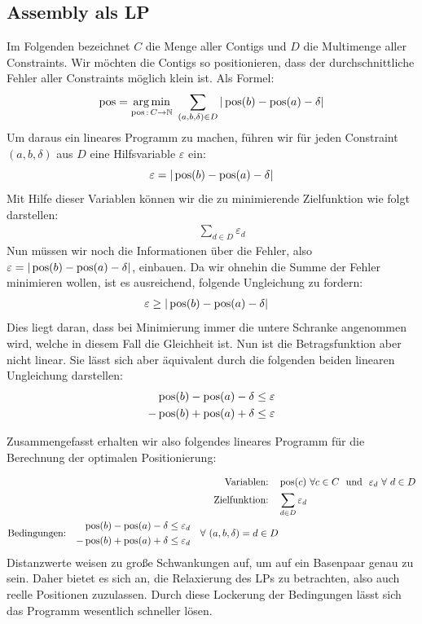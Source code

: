 \subsection{Assembly als LP}
Im Folgenden bezeichnet $C$ die Menge aller Contigs und $D$ die Multimenge aller Constraints.
Wir möchten die Contigs so positionieren, dass der durchschnittliche Fehler aller Constraints möglich klein ist. Als Formel:
\[ \operatorname*{pos} = \operatorname*{arg\,min}_{\operatorname*{pos}\,:\, C \rightarrow \mathbb{N}} \ \sum_{(a,b,\delta) \in D} |\operatorname*{pos}(b) - \operatorname*{pos}(a) - \delta| \]
Um daraus ein lineares Programm zu machen, führen wir für jeden Constraint $(a,b,\delta)$ aus $D$ eine Hilfsvariable $\varepsilon$ ein:
\[ \varepsilon = |\operatorname*{pos}(b) - \operatorname*{pos}(a) - \delta| \]
Mit Hilfe dieser Variablen können wir die zu minimierende Zielfunktion wie folgt darstellen:
\begin{align*}
\quad& \sum_{d \in D} \varepsilon_{d}
\end{align*}
Nun müssen wir noch die Informationen über die Fehler, also $\varepsilon = |\operatorname*{pos}(b) - \operatorname*{pos}(a) - \delta|$, einbauen. Da wir ohnehin die Summe der Fehler minimieren wollen, ist es ausreichend, folgende Ungleichung zu fordern:
\begin{align*}
\varepsilon \geq |\operatorname*{pos}(b) &- \operatorname*{pos}(a) - \delta|
\end{align*}
Dies liegt daran, dass bei Minimierung immer die untere Schranke angenommen wird, welche in diesem Fall die Gleichheit ist. Nun ist die Betragsfunktion aber nicht linear. Sie lässt sich aber äquivalent durch die folgenden beiden linearen Ungleichung darstellen:
\begin{align*}
\operatorname*{pos}(b) - \operatorname*{pos}(a) - \delta &\leq \varepsilon\\
-\operatorname*{pos}(b) + \operatorname*{pos}(a) + \delta &\leq \varepsilon
\end{align*}

Zusammengefasst erhalten wir also folgendes lineares Programm für die Berechnung der optimalen Positionierung:

\begin{align*}
\text{Variablen:}\quad& \pos(c) \ \forall c \in C \ \ \text{und} \ \ \varepsilon_{d} \ \forall \ d \in D\\
\text{Zielfunktion:}\quad& \sum_{d \in D} \varepsilon_{d}\\
\text{Bedingungen:}\quad \begin{split} \pos(b) - \pos(a) - \delta \leq \varepsilon_{d}\\
-\pos(b) + \pos(a) + \delta \leq \varepsilon_{d} \end{split}\quad \forall \ (a,b,\delta) = d \in D
\end{align*}
Distanzwerte weisen zu große Schwankungen auf, um auf ein Basenpaar genau zu sein. Daher bietet es sich an, die Relaxierung des LPs zu betrachten, also auch reelle Positionen zuzulassen. Durch diese Lockerung der Bedingungen lässt sich das Programm wesentlich schneller lösen.

